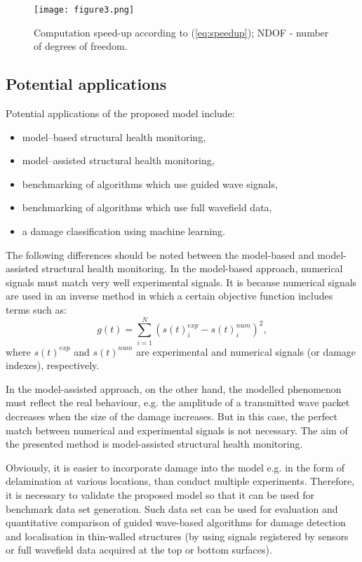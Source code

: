 \documentclass[12pt]{iopart}
\begin{document}
\begin{figure} [h!]
	\centering
	\texttt{[image: figure3.png]}	
	\caption{Computation speed-up according to (\ref{eq:speedup}); NDOF - number of degrees of freedom.}
	\label{fig:speed-up}
\end{figure}
\newpage

\subsection{Potential applications}

Potential applications of the proposed model include:
\begin{itemize}
	\item model--based structural health monitoring,
	\item model--assisted structural health monitoring,
	\item benchmarking of algorithms which use guided wave signals,
	\item benchmarking of algorithms which use full wavefield data,
	\item a damage classification using machine learning.
\end{itemize}
The following differences should be noted between the model-based and model-assisted structural health monitoring.
In the model-based approach, numerical signals must match very well experimental signals. It is because numerical signals are used in an inverse method in which a certain objective function includes terms such as:
\begin{equation}
g(t) = \sum_{i=1}^{N} \left(s(t)_i^{exp} - s(t)_i^{num}\right)^2,
\label{eq:obj_fun}
\end{equation}
where \(s(t)^{exp}\) and \(s(t)^{num}\) are experimental and numerical signals (or damage indexes), respectively.

In the model-assisted approach, on the other hand, the modelled phenomenon must reflect the real behaviour, e.g. the amplitude of a transmitted wave packet decreases when the size of the damage increases. But in this case, the perfect match between numerical and experimental signals is not necessary. The aim of the presented method is model-assisted structural health monitoring.

Obviously, it is easier to incorporate damage into the model e.g. in the form of delamination at various locations, than conduct multiple experiments. Therefore, it is necessary to validate the proposed model so that it can be used for benchmark data set generation. Such data set can be used for evaluation and quantitative comparison of guided wave-based algorithms for damage detection and localisation in thin-walled structures (by using signals registered by sensors or full wavefield data acquired at the top or bottom surfaces).
\end{document}

